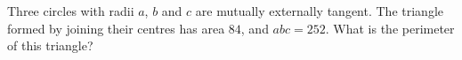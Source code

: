 Three circles with radii $a$, $b$ and $c$ are mutually externally tangent. The triangle formed by joining their centres has area $84$, and $abc=252$. What is the perimeter of this triangle?
